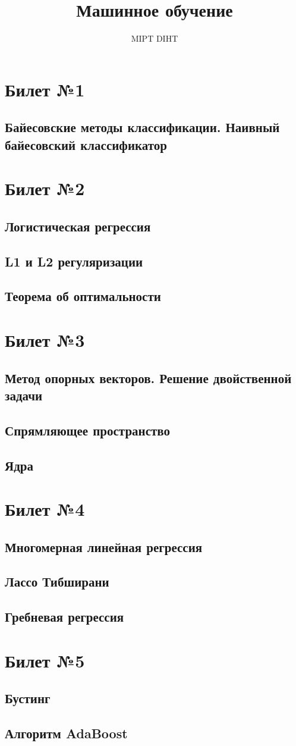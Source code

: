 \documentclass[a4paper]{article}
\title{Машинное обучение}
\author{MIPT DIHT}
\begin{document}
\maketitle

\section{Билет №1}
\subsection{Байесовские методы классификации. Наивный байесовский классификатор}

\section{Билет №2}
\subsection{Логистическая регрессия}
\subsection{L1 и L2 регуляризации}
\subsection{Теорема об оптимальности}

\section{Билет №3}
\subsection{Метод опорных векторов. Решение двойственной задачи}
\subsection{Спрямляющее пространство}
\subsection{Ядра}

\section{Билет №4}
\subsection{Многомерная линейная регрессия}
\subsection{Лассо Тибширани}
\subsection{Гребневая регрессия}

\section{Билет №5}
\subsection{Бустинг}
\subsection{Алгоритм AdaBoost}
\end{document}
